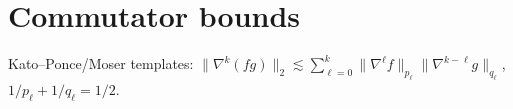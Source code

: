 \section{Commutator bounds}\label{app:comm}
Kato--Ponce/Moser templates: $\|\nabla^k(fg)\|_2 \lesssim \sum_{\ell=0}^k \|\nabla^\ell f\|_{p_\ell}\|\nabla^{k-\ell} g\|_{q_\ell}$, $1/p_\ell+1/q_\ell=1/2$.
